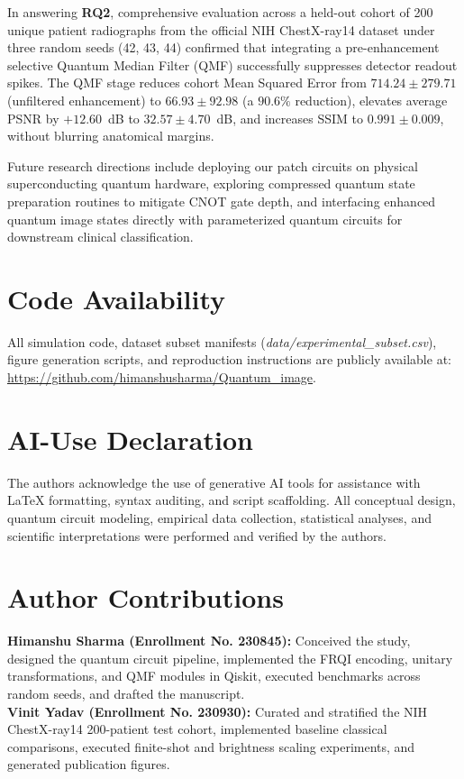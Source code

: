 \documentclass[12pt,onecolumn,draftclsnofoot]{IEEEtran}
\begin{document}
In answering \textbf{RQ2}, comprehensive evaluation across a held-out cohort of 200 unique patient radiographs from the official NIH ChestX-ray14 dataset under three random seeds (42, 43, 44) confirmed that integrating a pre-enhancement selective Quantum Median Filter (QMF) successfully suppresses detector readout spikes. The QMF stage reduces cohort Mean Squared Error from $714.24 \pm 279.71$ (unfiltered enhancement) to $66.93 \pm 92.98$ (a $90.6\%$ reduction), elevates average PSNR by $+12.60$~dB to $32.57 \pm 4.70$~dB, and increases SSIM to $0.991 \pm 0.009$, without blurring anatomical margins.

Future research directions include deploying our patch circuits on physical superconducting quantum hardware, exploring compressed quantum state preparation routines to mitigate CNOT gate depth, and interfacing enhanced quantum image states directly with parameterized quantum circuits for downstream clinical classification.
\section*{Code Availability}
All simulation code, dataset subset manifests (\emph{data/experimental\_subset.csv}), figure generation scripts, and reproduction instructions are publicly available at: \url{https://github.com/himanshusharma/Quantum_image}.

\section*{AI-Use Declaration}
The authors acknowledge the use of generative AI tools for assistance with LaTeX formatting, syntax auditing, and script scaffolding. All conceptual design, quantum circuit modeling, empirical data collection, statistical analyses, and scientific interpretations were performed and verified by the authors.

\section*{Author Contributions}
\textbf{Himanshu Sharma (Enrollment No. 230845):} Conceived the study, designed the quantum circuit pipeline, implemented the FRQI encoding, unitary transformations, and QMF modules in Qiskit, executed benchmarks across random seeds, and drafted the manuscript. \\
\textbf{Vinit Yadav (Enrollment No. 230930):} Curated and stratified the NIH ChestX-ray14 200-patient test cohort, implemented baseline classical comparisons, executed finite-shot and brightness scaling experiments, and generated publication figures.
\end{document}
